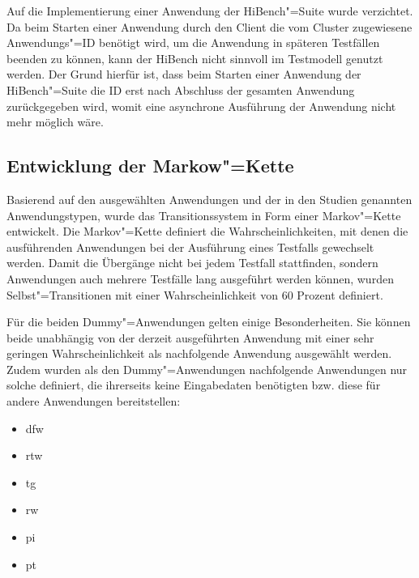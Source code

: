 Auf die Implementierung einer Anwendung der HiBench"=Suite wurde verzichtet.
Da beim Starten einer Anwendung durch den Client die vom Cluster zugewiesene Anwendungs"=ID benötigt wird, um die Anwendung in späteren Testfällen beenden zu können, kann der HiBench nicht sinnvoll im Testmodell genutzt werden.
Der Grund hierfür ist, dass beim Starten einer Anwendung der HiBench"=Suite die ID erst nach Abschluss der gesamten Anwendung zurückgegeben wird, womit eine asynchrone Ausführung der Anwendung nicht mehr möglich wäre.

\subsection{Entwicklung der Markow"=Kette}
\label{subsec:markovChain}

Basierend auf den ausgewählten Anwendungen und der in den Studien genannten Anwendungstypen, wurde das Transitionssystem in Form einer Markov"=Kette entwickelt.
Die Markov"=Kette definiert die Wahrscheinlichkeiten, mit denen die ausführenden Anwendungen bei der Ausführung eines Testfalls gewechselt werden.
Damit die Übergänge nicht bei jedem Testfall stattfinden, sondern Anwendungen auch mehrere Testfälle lang ausgeführt werden können, wurden Selbst"=Transitionen mit einer Wahrscheinlichkeit von 60 Prozent definiert.

Für die beiden Dummy"=Anwendungen gelten einige Besonderheiten.
Sie können beide unabhängig von der derzeit ausgeführten Anwendung mit einer sehr geringen Wahrscheinlichkeit als nachfolgende Anwendung ausgewählt werden.
Zudem wurden als den Dummy"=Anwendungen nachfolgende Anwendungen nur solche definiert, die ihrerseits keine Eingabedaten benötigten bzw. diese für andere Anwendungen bereitstellen:

\begin{itemize}
    \item \acrlong{dfw}
    \item \acrlong{rtw}
    \item \acrlong{tg}
    \item \acrlong{rw}
    \item \acrlong{pi}
    \item \acrlong{pt}
\end{itemize}

